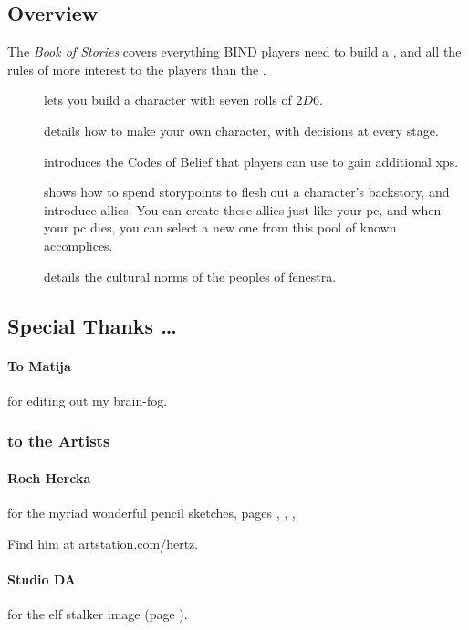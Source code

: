 \begin{multicols}{2}

\subsection*{Overview}

The \textit{Book of Stories} covers everything BIND players need to build a , and all the rules of more interest to the players than the .

\begin{description}
  \item[]
  lets you build a character with seven rolls of $2D6$.
  \item[]
  details how to make your own character, with decisions at every stage.
  \item[] introduces the Codes of Belief that players can use to gain additional \glspl{xp}.
  \item[] shows how to spend \glspl{storypoint} to flesh out a character's backstory, and introduce allies.
  You can create these allies just like your \gls{pc}, and when your \gls{pc} dies, you can select a new one from this pool of known accomplices.
  \item[] details the cultural norms of the peoples of \gls{fenestra}.
\end{description}

\columnbreak

\subsection*{Special Thanks \ldots}

\paragraph{To Matija}
for editing out my brain-fog.

\subsubsection*{to the Artists}

\paragraph{Roch Hercka} for the myriad wonderful pencil sketches, pages 
\pageref{Roch_Hercka/five_races}, 
\pageref{Roch_Hercka/xp-1}, 
\pageref{Roch_Hercka/xp-2}, 

Find him at artstation.com/hertz.

\paragraph{Studio DA}
for the elf stalker image
(page \pageref{Studio_DA/elf_stalker}).

\end{multicols}

\clearpage
